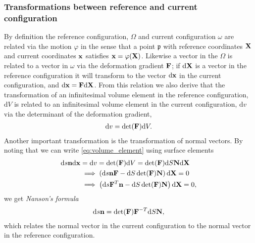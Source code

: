 \subsubsection{Transformations between reference and current
  configuration}
By definition the reference configuration, $\Omega$ and current
configuration $\omega$ are related via the motion $\varphi$ in the
sense that a point $\mathfrak{p}$ with reference coordinates $\mathbf{X}$ and current
coordinates $\mathbf{x}$ satisfies $\mathbf{x} = \varphi(\mathbf{X})$. Likewise a
vector in the $\Omega$ is related to a vector in $\omega$ via the
deformation gradient $\mathbf{F}$; if $\mathrm{d}\mathbf{X}$ is a vector in the
reference configuration it will transform to the vector
$\mathrm{d}\mathbf{x}$ in the current configuration, and $\mathrm{d}\mathbf{x} =
\mathbf{F} \mathrm{d}\mathbf{X}$. From this relation we also derive that the
transformation of an infinitesimal volume element in the reference
configuration, $\mathrm{d}V$ is related to an infinitesimal volume
element in the current configuration, $\mathrm{d}v$  via the determinant of the
deformation gradient,
\begin{align}
  \mathrm{d}v =\det(\mathbf{F}) \mathrm{d}V.
  \label{eq:volume_element}
\end{align}
Another important transformation is the transformation of normal
vectors. By noting that we can write \eqref{eq:volume_element} using
surface elements
\begin{align*}
  \mathrm{d}s \mathbf{n} \mathrm{d}\mathbf{x}  &= \mathrm{d}v = \det(\mathbf{F}) \mathrm{d}V = \det(\mathbf{F}) \mathrm{d}S  \mathbf{N} \mathrm{d}\mathbf{X}\\
  &\implies \left( \mathrm{d}s \mathbf{n} \mathbf{F}  - \mathrm{d}S \det(\mathbf{F}) \mathbf{N} \right) \mathrm{d}\mathbf{X} = 0\\
  &\implies \left( \mathrm{d}s \mathbf{F}^T \mathbf{n}  - \mathrm{d}S \det(\mathbf{F}) \mathbf{N} \right) \mathrm{d}\mathbf{X} = 0,\\
\end{align*}
we get \emph{Nanson's formula}
\begin{align}
  \mathrm{d}s \mathbf{n}  =  \det(\mathbf{F}) \mathbf{F}^{-T} \mathrm{d}S \mathbf{N},
\end{align}
which relates the normal vector in the current configuration to the
normal vector in the reference configuration.


